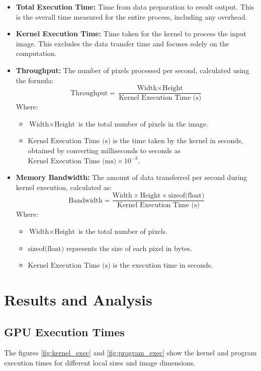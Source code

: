 \documentclass{article}
\begin{document}
\begin{itemize}
    \item \textbf{Total Execution Time:} Time from data preparation to result output. This is the overall time measured for the entire process, including any overhead.

    \item \textbf{Kernel Execution Time:} Time taken for the kernel to process the input image. This excludes the data transfer time and focuses solely on the computation.

    \item \textbf{Throughput:} The number of pixels processed per second, calculated using the formula:
    \[
    \text{Throughput} = \frac{\text{Width} \times \text{Height}}{\text{Kernel Execution Time (s)}}
    \]
    Where:
    \begin{itemize}
        \item \(\text{Width} \times \text{Height}\) is the total number of pixels in the image.
        \item \(\text{Kernel Execution Time (s)}\) is the time taken by the kernel in seconds, obtained by converting milliseconds to seconds as \(\text{Kernel Execution Time (ms)} \times 10^{-3}\).
    \end{itemize}

    \item \textbf{Memory Bandwidth:} The amount of data transferred per second during kernel execution, calculated as:
    \[
    \text{Bandwidth} = \frac{\text{Width} \times \text{Height} \times \text{sizeof(float)}}{\text{Kernel Execution Time (s)}}
    \]
    Where:
    \begin{itemize}
        \item \(\text{Width} \times \text{Height}\) is the total number of pixels.
        \item \(\text{sizeof(float)}\) represents the size of each pixel in bytes.
        \item \(\text{Kernel Execution Time (s)}\) is the execution time in seconds.
    \end{itemize}


\end{itemize}

\section*{Results and Analysis}

\subsection*{GPU Execution Times}
The figures \ref{fig:kernel_exec} and \ref{fig:program_exec} show the kernel and 
program execution times for different local sizes and image dimensions.
\end{document}

